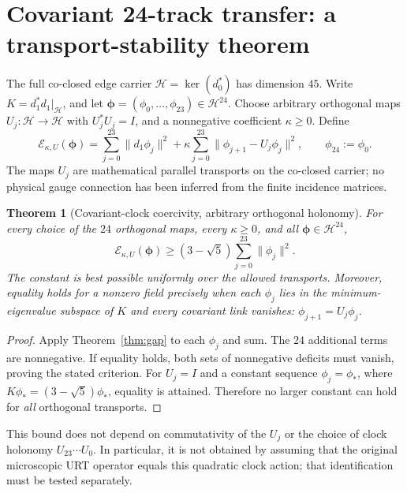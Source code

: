 \documentclass[11pt,a4paper]{article}
\newtheorem{theorem}{Theorem}
\begin{document}
\section{Covariant 24-track transfer: a transport-stability theorem}
The full co-closed edge carrier $\mathcal H=\ker(d_0^{\!*})$ has dimension $45$.
Write $K=d_1^{\!*}d_1\big|_{\mathcal H}$, and let
$\boldsymbol\phi=(\phi_0,\ldots,\phi_{23})\in\mathcal H^{24}$.
Choose arbitrary orthogonal maps $U_j:\mathcal H\to\mathcal H$ with
$U_j^{\!*}U_j=I$, and a nonnegative coefficient $\kappa\ge0$. Define
\begin{equation}\label{eq:covenergy}
\mathcal E_{\kappa,U}(\boldsymbol\phi)=
\sum_{j=0}^{23}\|d_1\phi_j\|^2
+\kappa\sum_{j=0}^{23}\|\phi_{j+1}-U_j\phi_j\|^2,
\qquad \phi_{24}:=\phi_0.
\end{equation}
The maps $U_j$ are mathematical parallel transports on the co-closed carrier;
no physical gauge connection has been inferred from the finite incidence matrices.

\begin{theorem}[Covariant-clock coercivity, arbitrary orthogonal holonomy]
\label{thm:clock}
For every choice of the $24$ orthogonal maps, every $\kappa\ge0$, and
all $\boldsymbol\phi\in\mathcal H^{24}$,
\begin{equation}\label{eq:clockgap}
\boxed{\quad \mathcal E_{\kappa,U}(\boldsymbol\phi)
\ge (3-\sqrt5)\sum_{j=0}^{23}\|\phi_j\|^2.\quad}
\end{equation}
The constant is best possible \emph{uniformly over} the allowed transports.
Moreover, equality holds for a nonzero field precisely when each $\phi_j$
lies in the minimum-eigenvalue subspace of $K$ and every covariant link
vanishes: $\phi_{j+1}=U_j\phi_j$.
\end{theorem}
\begin{proof}
Apply Theorem~\ref{thm:gap} to each $\phi_j$ and sum. The $24$
additional terms are nonnegative. If equality holds, both sets of
nonnegative deficits must vanish, proving the stated criterion.
For $U_j=I$ and a constant sequence $\phi_j=\phi_*$, where
$K\phi_*=(3-\sqrt5)\phi_*$, equality is attained. Therefore no larger
constant can hold for \emph{all} orthogonal transports.
\end{proof}

This bound does not depend on commutativity of the $U_j$ or the choice of
clock holonomy $U_{23}\cdots U_0$. In particular, it is not obtained by
assuming that the original microscopic URT operator equals this quadratic
clock action; that identification must be tested separately.
\end{document}
